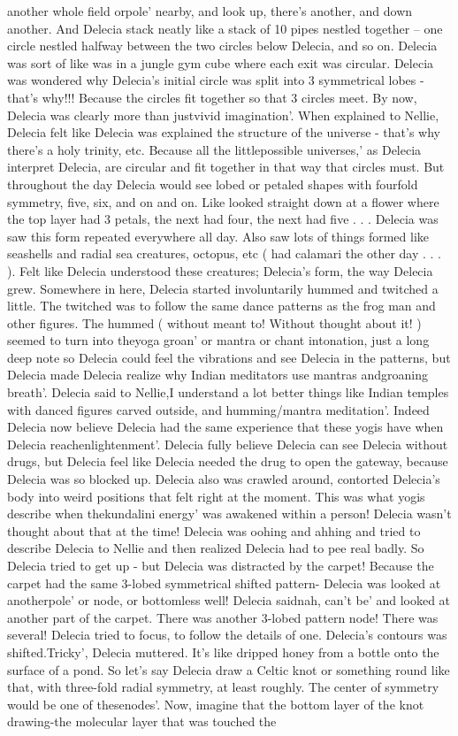 \documentclass[12pt]{book}
\begin{document}
another whole field orpole' nearby, and look up, there's another, and down another. And Delecia stack neatly like a stack of 10 pipes nestled together -- one circle nestled halfway between the two circles below Delecia, and so on. Delecia was sort of like was in a jungle gym cube where each exit was circular. Delecia was wondered why Delecia's initial circle was split into 3 symmetrical lobes - that's why!!! Because the circles fit together so that 3 circles meet. By now, Delecia was clearly more than justvivid imagination'. When explained to Nellie, Delecia felt like Delecia was explained the structure of the universe - that's why there's a holy trinity, etc. Because all the littlepossible universes,' as Delecia interpret Delecia, are circular and fit together in that way that circles must. But throughout the day Delecia would see lobed or petaled shapes with fourfold symmetry, five, six, and on and on. Like looked straight down at a flower where the top layer had 3 petals, the next had four, the next had five . . .  Delecia was saw this form repeated everywhere all day. Also saw lots of things formed like seashells and radial sea creatures, octopus, etc ( had calamari the other day . . . ). Felt like Delecia understood these creatures; Delecia's form, the way Delecia grew. Somewhere in here, Delecia started involuntarily hummed and twitched a little. The twitched was to follow the same dance patterns as the frog man and other figures. The hummed ( without meant to! Without thought about it! ) seemed to turn into theyoga groan' or mantra or chant intonation, just a long deep note so Delecia could feel the vibrations and see Delecia in the patterns, but Delecia made Delecia realize why Indian meditators use mantras andgroaning breath'. Delecia said to Nellie,I understand a lot better things like Indian temples with danced figures carved outside, and humming/mantra meditation'. Indeed Delecia now believe Delecia had the same experience that these yogis have when Delecia reachenlightenment'. Delecia fully believe Delecia can see Delecia without drugs, but Delecia feel like Delecia needed the drug to open the gateway, because Delecia was so blocked up. Delecia also was crawled around, contorted Delecia's body into weird positions that felt right at the moment. This was what yogis describe when thekundalini energy' was awakened within a person! Delecia wasn't thought about that at the time! Delecia was oohing and ahhing and tried to describe Delecia to Nellie and then realized Delecia had to pee real badly. So Delecia tried to get up - but Delecia was distracted by the carpet! Because the carpet had the same 3-lobed symmetrical shifted pattern- Delecia was looked at anotherpole' or node, or bottomless well! Delecia saidnah, can't be' and looked at another part of the carpet. There was another 3-lobed pattern node! There was several! Delecia tried to focus, to follow the details of one. Delecia's contours was shifted.Tricky', Delecia muttered. It's like dripped honey from a bottle onto the surface of a pond. So let's say Delecia draw a Celtic knot or something round like that, with three-fold radial symmetry, at least roughly. The center of symmetry would be one of thesenodes'. Now, imagine that the bottom layer of the knot drawing-the molecular layer that was touched the 
\end{document}
